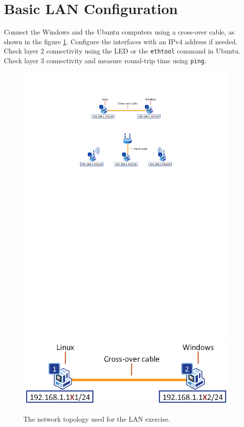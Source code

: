 \section{Basic LAN Configuration}

Connect the Windows and the Ubuntu computers using a cross-over cable, as shown in the figure \ref{fig:Lan}. Configure the interfaces with an IPv4 address if needed. Check layer 2 connectivity using the LED or the \texttt{\color{blue}ethtool} command in Ubuntu. Check layer 3 connectivity and measure round-trip time using \texttt{\color{blue}ping}.

\begin{figure}
\centering
\ifpdf
\includegraphics[width=0.9\linewidth]{Figures/Lan.pdf}
\else
\includegraphics[width=0.9\linewidth]{Figures/Lan.eps}
\fi
\caption{The network topology used for the LAN exercise.}
\label{fig:Lan}
\end{figure}

